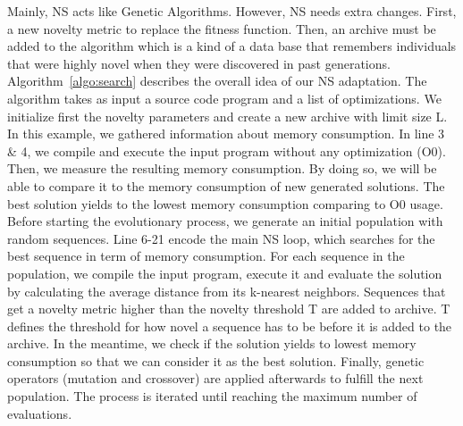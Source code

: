 Mainly, NS acts like Genetic Algorithms. However, NS needs extra changes. First, a new novelty metric to replace the fitness function. Then, an archive must be added to the algorithm which is a kind of a data base that remembers individuals that were highly novel when they were discovered in past generations. 
Algorithm~\ref{algo:search} describes the overall idea of our NS adaptation. The algorithm takes as input a source code program and a list of optimizations. We initialize first the novelty parameters and create a new archive with limit size L. In this example, we gathered information about memory consumption. In line 3 \& 4, we compile and execute the input program without any optimization (O0). Then, we measure the resulting memory consumption. By doing so, we will be able to compare it to the memory consumption of new generated solutions. The best solution yields to the lowest memory consumption comparing to O0 usage.
Before starting the evolutionary process, we generate an initial population with random sequences. Line 6-21 encode the main NS loop, which searches for the best sequence in term of memory consumption. For each sequence in the population, we compile the input program, execute it and evaluate the solution by calculating the average distance from its k-nearest neighbors. Sequences that get a novelty metric higher than the novelty threshold T are added to archive. T defines the threshold for how novel a sequence has to be before it is added to the archive. In the meantime, we check if the solution yields to lowest memory consumption so that we can consider it as the best solution. Finally, genetic operators
(mutation and crossover) are applied afterwards to fulfill the next population. The process is iterated until reaching the maximum number of evaluations.


